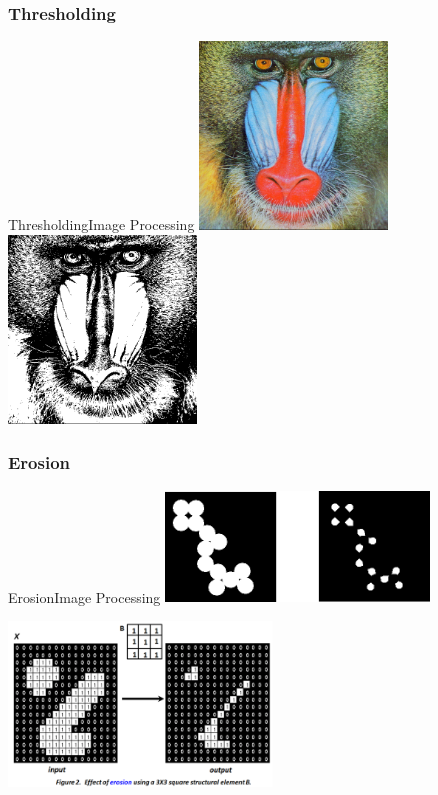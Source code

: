 \documentclass{beamer}
\begin{document}
\subsubsection{Thresholding}
\begin{frame}{Thresholding}{Image Processing}
\centering
    \includegraphics[width=50mm]{images/baboon.jpg}\includegraphics[width=50mm]{images/thresholded.png}

\end{frame}

\subsubsection{Erosion}
\begin{frame}{Erosion}{Image Processing}
\centering
    \includegraphics[width=70mm]{images/erosion2.png}

\centering    
    \includegraphics[width=70mm]{images/erosion.png}

\end{frame}
\end{document}
